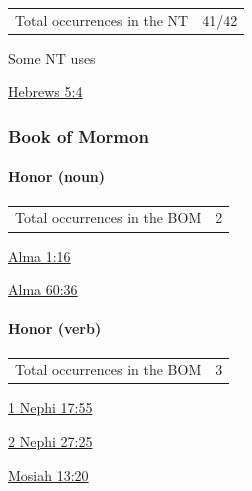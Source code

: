 				\begin{tabular}{ll}
					Total occurrences in the NT & 41/42
				\end{tabular}
				
				\begin{compactdesc}
					\item[Some NT uses] \textbf{}
						\begin{compactdesc}
							\item[{\hyperref[HEBREWS-5-4]{Hebrews 5:4}}] 
						\end{compactdesc}
				\end{compactdesc}
				
		
	\subsubsection{Book of Mormon} %
		\label{HONOR-BOM}
		
		\paragraph{Honor (noun)}
	
			\begin{tabular}{ll}
				Total occurrences in the BOM & 2
			\end{tabular}
			
			\begin{compactdesc}
				\item[{\hyperref[ALMA-1-16]{Alma 1:16}}]
				\item[{\hyperref[ALMA-60-36]{Alma 60:36}}]
			\end{compactdesc}
			
		\paragraph{Honor (verb)}
	
			\begin{tabular}{ll}
				Total occurrences in the BOM & 3
			\end{tabular}
			
			\begin{compactdesc}
				\item[{\hyperref[1NEPHI-17-55]{1 Nephi 17:55}}]
				\item[{\hyperref[2NEPHI-27-25]{2 Nephi 27:25}}]
				\item[{\hyperref[MOSIAH-13-20]{Mosiah 13:20}}]
			\end{compactdesc}
			
